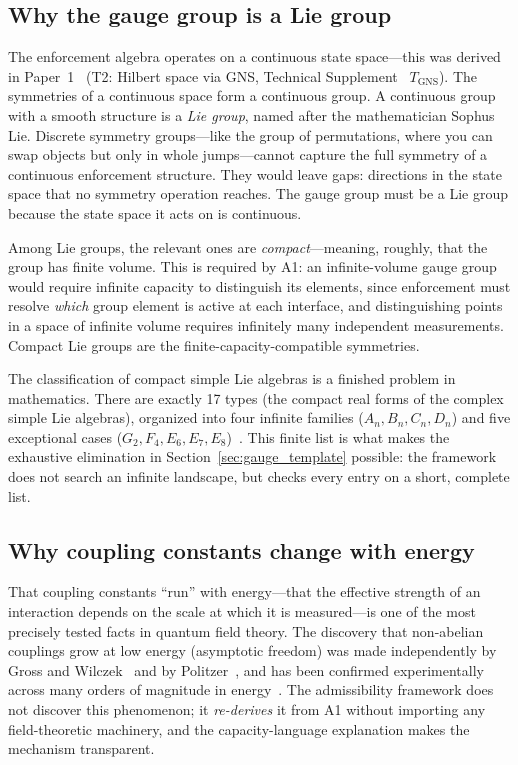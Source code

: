 \documentclass[11pt]{article}
\begin{document}
\subsection{Why the gauge group is a Lie group}

The enforcement algebra operates on a continuous state space---this was derived in Paper~1~\cite{BrookePaper1} (T2: Hilbert space via GNS, Technical Supplement~\cite{BrookeSupplement} $T_{\mathrm{GNS}}$).  The symmetries of a continuous space form a continuous group.  A continuous group with a smooth structure is a \emph{Lie group}, named after the mathematician Sophus Lie.  Discrete symmetry groups---like the group of permutations, where you can swap objects but only in whole jumps---cannot capture the full symmetry of a continuous enforcement structure.  They would leave gaps: directions in the state space that no symmetry operation reaches.  The gauge group must be a Lie group because the state space it acts on is continuous.

Among Lie groups, the relevant ones are \emph{compact}---meaning, roughly, that the group has finite volume.  This is required by A1: an infinite-volume gauge group would require infinite capacity to distinguish its elements, since enforcement must resolve \emph{which} group element is active at each interface, and distinguishing points in a space of infinite volume requires infinitely many independent measurements.  Compact Lie groups are the finite-capacity-compatible symmetries.

The classification of compact simple Lie algebras is a finished problem in mathematics.  There are exactly 17 types (the compact real forms of the complex simple Lie algebras), organized into four infinite families ($A_n, B_n, C_n, D_n$) and five exceptional cases ($G_2, F_4, E_6, E_7, E_8$)~\cite{Humphreys1972}.  This finite list is what makes the exhaustive elimination in Section~\ref{sec:gauge_template} possible: the framework does not search an infinite landscape, but checks every entry on a short, complete list.

\subsection{Why coupling constants change with energy}

That coupling constants ``run'' with energy---that the effective strength of an interaction depends on the scale at which it is measured---is one of the most precisely tested facts in quantum field theory.  The discovery that non-abelian couplings grow at low energy (asymptotic freedom) was made independently by Gross and Wilczek~\cite{GrossWilczek1973} and by Politzer~\cite{Politzer1973}, and has been confirmed experimentally across many orders of magnitude in energy~\cite{PDG2024}.  The admissibility framework does not discover this phenomenon; it \emph{re-derives} it from A1 without importing any field-theoretic machinery, and the capacity-language explanation makes the mechanism transparent.
\end{document}
